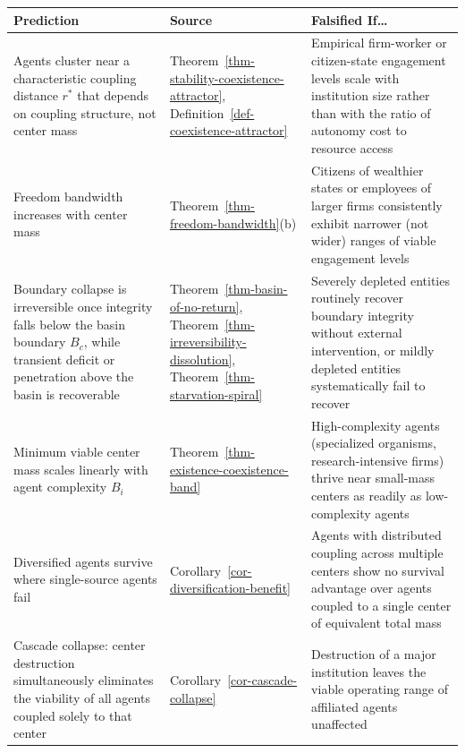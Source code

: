 \documentclass[11pt]{article}
\theoremstyle{plain}
\theoremstyle{definition}
\theoremstyle{remark}
\newcounter{none}
\begin{document}
{\def\LTcaptype{none} %
\begin{longtable}[]{@{}
  >{\raggedright\arraybackslash}p{}
  >{\raggedright\arraybackslash}p{}
  >{\raggedright\arraybackslash}p{}@{}}
\toprule\noalign{}
\begin{minipage}[b]{\linewidth}\raggedright
Prediction
\end{minipage} & \begin{minipage}[b]{\linewidth}\raggedright
Source
\end{minipage} & \begin{minipage}[b]{\linewidth}\raggedright
Falsified If\ldots{}
\end{minipage} \\
\midrule\noalign{}
\endhead
\bottomrule\noalign{}
\endlastfoot
Agents cluster near a characteristic coupling distance \(r^*\) that
depends on coupling structure, not center mass &
Theorem~\ref{thm-stability-coexistence-attractor},
Definition~\ref{def-coexistence-attractor} & Empirical firm-worker or
citizen-state engagement levels scale with institution size rather than
with the ratio of autonomy cost to resource access \\
Freedom bandwidth increases with center mass &
Theorem~\ref{thm-freedom-bandwidth}(b) & Citizens of wealthier states or
employees of larger firms consistently exhibit narrower (not wider)
ranges of viable engagement levels \\
Boundary collapse is irreversible once integrity falls below the basin
boundary \(B_c\), while transient deficit or penetration above the basin
is recoverable & Theorem~\ref{thm-basin-of-no-return},
Theorem~\ref{thm-irreversibility-dissolution},
Theorem~\ref{thm-starvation-spiral} & Severely depleted entities
routinely recover boundary integrity without external intervention, or
mildly depleted entities systematically fail to recover \\
Minimum viable center mass scales linearly with agent complexity \(B_i\)
& Theorem~\ref{thm-existence-coexistence-band} & High-complexity agents
(specialized organisms, research-intensive firms) thrive near small-mass
centers as readily as low-complexity agents \\
Diversified agents survive where single-source agents fail &
Corollary~\ref{cor-diversification-benefit} & Agents with distributed
coupling across multiple centers show no survival advantage over agents
coupled to a single center of equivalent total mass \\
Cascade collapse: center destruction simultaneously eliminates the
viability of all agents coupled solely to that center &
Corollary~\ref{cor-cascade-collapse} & Destruction of a major
institution leaves the viable operating range of affiliated agents
unaffected \\
\end{longtable}
}
\end{document}
